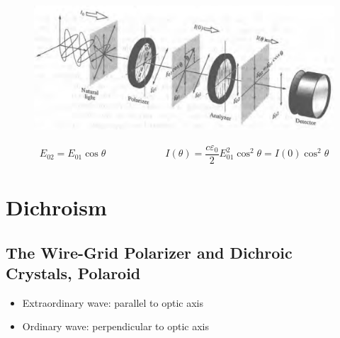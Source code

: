 \begin{figure}[H]
  \centering
  \includegraphics[width=0.5\linewidth]{figures/Malus}
\end{figure}

\begin{equation*}
    \begin{aligned}
      E_{02} = E_{01} \cos \theta \quad\quad \quad\quad \quad\quad 
      I \left( \theta \right) = \dfrac{c \varepsilon_0}{2} E_{01}^2 \cos^2 \theta = I \left( 0 \right) \cos^2 \theta
    \end{aligned}
\end{equation*}

\section{Dichroism}

\subsection{The Wire-Grid Polarizer and Dichroic Crystals, Polaroid}

\begin{itemize}
\item Extraordinary wave: parallel to optic axis
\item Ordinary wave: perpendicular to optic axis
\end{itemize}

